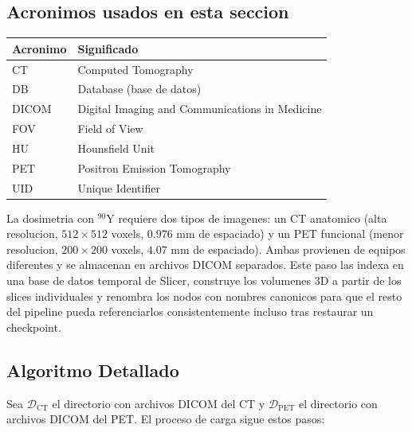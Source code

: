 \documentclass[12pt,a4paper]{article}
\begin{document}
\subsection*{Acronimos usados en esta seccion}
\begin{tabular}{ll}
\toprule
\textbf{Acronimo} & \textbf{Significado} \\
\midrule
CT & Computed Tomography \\
DB & Database (base de datos) \\
DICOM & Digital Imaging and Communications in Medicine \\
FOV & Field of View \\
HU & Hounsfield Unit \\
PET & Positron Emission Tomography \\
UID & Unique Identifier \\
\bottomrule
\end{tabular}

La dosimetria con $^{90}$Y requiere dos tipos de imagenes: un CT anatomico (alta resolucion,
$512\times512$ voxels, $0.976$ mm de espaciado) y un PET funcional (menor resolucion,
$200\times200$ voxels, $4.07$ mm de espaciado). Ambas provienen de equipos diferentes y se
almacenan en archivos DICOM separados. Este paso las indexa en una base de datos temporal de
Slicer, construye los volumenes 3D a partir de los slices individuales y renombra los nodos con
nombres canonicos para que el resto del pipeline pueda referenciarlos consistentemente incluso
tras restaurar un checkpoint.

\subsection{Algoritmo Detallado}

Sea $\mathcal{D}_{\text{CT}}$ el directorio con archivos DICOM del CT
y $\mathcal{D}_{\text{PET}}$ el directorio con archivos DICOM del PET.
El proceso de carga sigue estos pasos:
\end{document}
